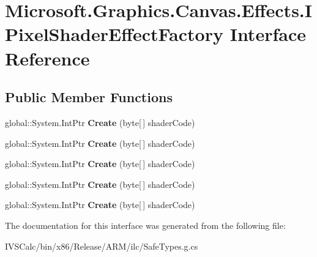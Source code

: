 \hypertarget{interface_microsoft_1_1_graphics_1_1_canvas_1_1_effects_1_1_i_pixel_shader_effect_factory}{}\section{Microsoft.\+Graphics.\+Canvas.\+Effects.\+I\+Pixel\+Shader\+Effect\+Factory Interface Reference}
\label{interface_microsoft_1_1_graphics_1_1_canvas_1_1_effects_1_1_i_pixel_shader_effect_factory}
\subsection*{Public Member Functions}
\begin{DoxyCompactItemize}
\item 
\mbox{\label{interface_microsoft_1_1_graphics_1_1_canvas_1_1_effects_1_1_i_pixel_shader_effect_factory_aabf211b9c2b6f6b312a78be62bbd32e4}} 
global\+::\+System.\+Int\+Ptr {\bfseries Create} (byte\mbox{[}$\,$\mbox{]} shader\+Code)
\item 
\mbox{\label{interface_microsoft_1_1_graphics_1_1_canvas_1_1_effects_1_1_i_pixel_shader_effect_factory_aabf211b9c2b6f6b312a78be62bbd32e4}} 
global\+::\+System.\+Int\+Ptr {\bfseries Create} (byte\mbox{[}$\,$\mbox{]} shader\+Code)
\item 
\mbox{\label{interface_microsoft_1_1_graphics_1_1_canvas_1_1_effects_1_1_i_pixel_shader_effect_factory_aabf211b9c2b6f6b312a78be62bbd32e4}} 
global\+::\+System.\+Int\+Ptr {\bfseries Create} (byte\mbox{[}$\,$\mbox{]} shader\+Code)
\item 
\mbox{\label{interface_microsoft_1_1_graphics_1_1_canvas_1_1_effects_1_1_i_pixel_shader_effect_factory_aabf211b9c2b6f6b312a78be62bbd32e4}} 
global\+::\+System.\+Int\+Ptr {\bfseries Create} (byte\mbox{[}$\,$\mbox{]} shader\+Code)
\item 
\mbox{\label{interface_microsoft_1_1_graphics_1_1_canvas_1_1_effects_1_1_i_pixel_shader_effect_factory_aabf211b9c2b6f6b312a78be62bbd32e4}} 
global\+::\+System.\+Int\+Ptr {\bfseries Create} (byte\mbox{[}$\,$\mbox{]} shader\+Code)
\end{DoxyCompactItemize}


The documentation for this interface was generated from the following file\+:\begin{DoxyCompactItemize}
\item 
I\+V\+S\+Calc/bin/x86/\+Release/\+A\+R\+M/ilc/Safe\+Types.\+g.\+cs\end{DoxyCompactItemize}
